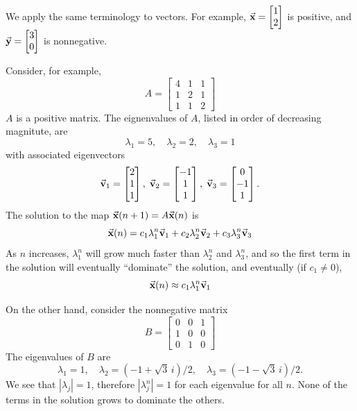We apply the same terminology to vectors. For example,
$\vec{\textbf{x}} = \begin{bmatrix} 1 \\ 2\end{bmatrix}$ is positive, and
$\vec{\textbf{y}} = \begin{bmatrix} 3 \\ 0\end{bmatrix}$ is nonnegative.

Consider, for example,
\begin{equation}
   A = \begin{bmatrix}
             4 & 1 & 1 \\ 1 & 2 & 1 \\ 1 & 1 & 2
       \end{bmatrix}
\end{equation}
$A$ is a positive matrix.
The eignenvalues of $A$, listed in order of decreasing magnitute,
are
\begin{equation}
   \lambda_1 = 5, \quad
   \lambda_2 = 2, \quad
   \lambda_3 = 1
\end{equation}
with associated eigenvectors
\begin{equation}
   \vec{\textbf{v}}_1 = \begin{bmatrix} 2 \\ 1 \\ 1 \end{bmatrix}, \;
   \vec{\textbf{v}}_2 = \begin{bmatrix} -1 \\ 1 \\ 1 \end{bmatrix}, \;
   \vec{\textbf{v}}_3 = \begin{bmatrix} 0 \\ -1 \\ 1 \end{bmatrix}.
\end{equation}
The solution to the map $\vec{\textbf{x}}(n+1) = A\vec{\textbf{x}}(n)$ is
\begin{equation}
   \vec{\textbf{x}}(n) = c_1 \lambda_1^n \vec{\textbf{v}}_1 + c_2 \lambda_2^n\vec{\textbf{v}}_2 + c_3 \lambda_3^n\vec{\textbf{v}}_3
\end{equation}
As $n$ increases, $\lambda_1^n$ will grow much faster than
$\lambda_2^n$ and $\lambda_3^n$, and so the first term in the
solution will eventually ``dominate'' the solution,
and eventually (if $c_1\ne 0$),
\begin{equation}
   \vec{\textbf{x}}(n) \approx c_1 \lambda_1^n \vec{\textbf{v}}_1
\end{equation}

On the other hand, consider the nonnegative matrix
\begin{equation}
   B = \begin{bmatrix}
             0 & 0 & 1 \\ 1 & 0 & 0 \\ 0 & 1 & 0
       \end{bmatrix}
\end{equation}
The eigenvalues of $B$ are
\begin{equation}
  \lambda_1 = 1, \quad
  \lambda_2 =  (-1+\sqrt{3}\,i)/2, \quad
  \lambda_3 =  (-1-\sqrt{3}\,i)/2.
\end{equation}
We see that $|\lambda_j| = 1$,
therefore $|\lambda_j^n| = 1$ for each eigenvalue for all $n$.
None of the terms in the solution grows to dominate the others.

